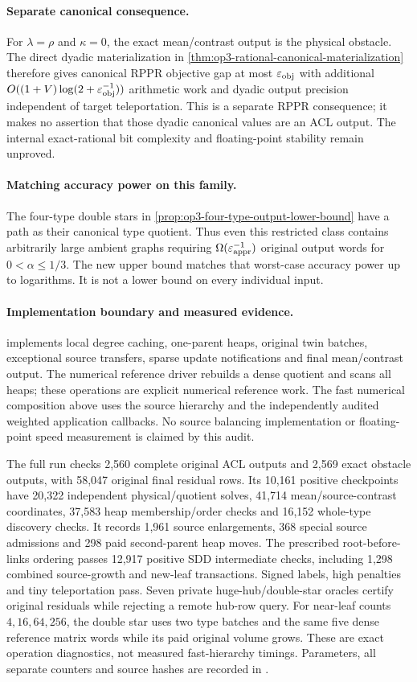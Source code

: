 \paragraph{Separate canonical consequence.}
For $\lambda=\rho$ and $\kappa=0$, the exact mean/contrast output is the
physical obstacle. The direct dyadic materialization in
\cref{thm:op3-rational-canonical-materialization} therefore gives canonical
RPPR objective gap at most $\varepsilon_{\mathrm{obj}}$ with additional
$O((1+V)\log(2+\varepsilon_{\mathrm{obj}}^{-1}))$ arithmetic work and dyadic output precision
independent of target teleportation. This is a separate RPPR consequence;
it makes no assertion that those dyadic canonical values are an ACL output.
The internal exact-rational bit complexity and floating-point stability
remain unproved.

\paragraph{Matching accuracy power on this family.}
The four-type double stars in
\cref{prop:op3-four-type-output-lower-bound} have a path as their canonical
type quotient. Thus even this restricted class contains arbitrarily large
ambient graphs requiring $\Omega(\varepsilon_{\mathrm{appr}}^{-1})$ original output words for
$0<\alpha\leq1/3$. The new upper bound matches that worst-case accuracy
power up to logarithms. It is not a lower bound on every individual input.

\paragraph{Implementation boundary and measured evidence.}
 implements local degree caching, one-parent
heaps, original twin batches, exceptional source transfers, sparse update
notifications and final mean/contrast output. The numerical reference
driver rebuilds a dense quotient and scans all heaps;
these operations are explicit numerical reference work. The fast numerical
composition above uses the source hierarchy and the independently audited
weighted application callbacks. No source balancing implementation or
floating-point speed measurement is claimed by this audit.

The full run checks 2,560 complete original ACL outputs and 2,569 exact
obstacle outputs, with 58,047 original final residual rows. Its 10,161
positive checkpoints have 20,322 independent physical/quotient solves,
41,714 mean/source-contrast coordinates, 37,583 heap membership/order
checks and 16,152 whole-type discovery checks. It records 1,961 source
enlargements, 368 special source admissions and 298 paid second-parent
heap moves. The prescribed root-before-links ordering passes 12,917
positive SDD intermediate checks, including 1,298 combined source-growth
and new-leaf transactions. Signed labels, high penalties and tiny
teleportation pass. Seven private huge-hub/double-star oracles certify
original residuals while rejecting a remote hub-row query. For near-leaf
counts $4,16,64,256$, the double star uses two type batches and the same
five dense reference matrix words while its paid original volume grows.
These are exact operation diagnostics, not measured fast-hierarchy timings.
Parameters, all separate counters and source hashes are recorded in
.
